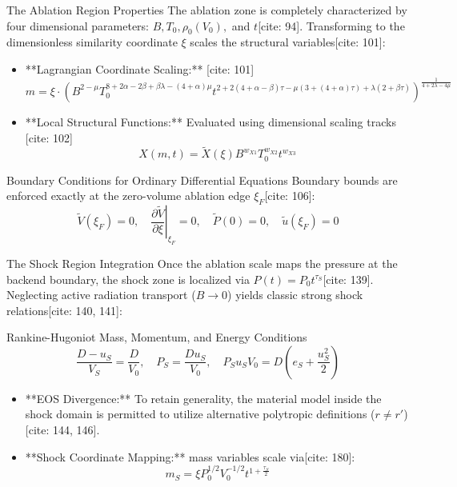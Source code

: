\documentclass[presentation,10pt]{beamer}
\begin{document}
\begin{frame}{The Ablation Region Properties}
  The ablation zone is completely characterized by four dimensional parameters: $B, T_0, \rho_0 (V_0),$ and $t$[cite: 94]. Transforming to the dimensionless similarity coordinate $\xi$ scales the structural variables[cite: 101]:

  \begin{itemize}
    \item **Lagrangian Coordinate Scaling:** [cite: 101]
    $$m = \xi \cdot \left(B^{2-\mu}T_0^{8+2\alpha-2\beta+\beta\lambda-(4+\alpha)\mu} t^{2+2(4+\alpha-\beta)\tau - \mu(3+(4+\alpha)\tau) + \lambda(2+\beta\tau)}\right)^{\frac{1}{4+2\lambda-4\mu}}$$
    \item **Local Structural Functions:** Evaluated using dimensional scaling tracks [cite: 102]
    $$X(m,t) = \tilde{X}(\xi) B^{w_{X1}} T_0^{w_{X2}} t^{w_{X3}}$$
  \end{itemize}

  \begin{block}{Boundary Conditions for Ordinary Differential Equations}
    Boundary bounds are enforced exactly at the zero-volume ablation edge $\xi_F$[cite: 106]:
    $$\tilde{V}(\xi_F)=0, \quad \left.\frac{\partial\tilde{V}}{\partial\xi}\right|_{\xi_F}=0, \quad \tilde{P}(0)=0, \quad \tilde{u}(\xi_F)=0$$ %
  \end{block}
\end{frame}

\begin{frame}{The Shock Region Integration}
  Once the ablation scale maps the pressure at the backend boundary, the shock zone is localized via $P(t) = P_0 t^{\tau_S}$[cite: 139]. Neglecting active radiation transport ($B \to 0$) yields classic strong shock relations[cite: 140, 141]:

  \begin{block}{Rankine-Hugoniot Mass, Momentum, and Energy Conditions}
    $$\frac{D - u_S}{V_S} = \frac{D}{V_0}, \quad P_S = \frac{D u_S}{V_0}, \quad P_S u_S V_0 = D\left(e_S + \frac{u_S^2}{2}\right)$$ %
  \end{block}

  \begin{itemize}
    \item **EOS Divergence:** To retain generality, the material model inside the shock domain is permitted to utilize alternative polytropic definitions ($r \neq r'$)[cite: 144, 146].
    \item **Shock Coordinate Mapping:** mass variables scale via[cite: 180]:
    $$m_S = \xi P_0^{1/2} V_0^{-1/2} t^{1 + \frac{\tau_S}{2}}$$
  \end{itemize}
\end{frame}
\end{document}
